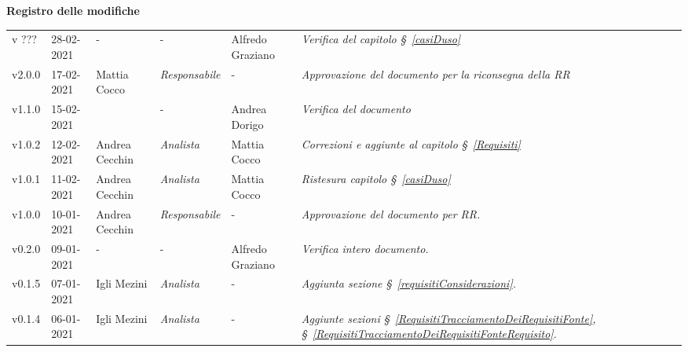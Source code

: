 \quad
\begin{center}
	\LARGE\textbf{Registro delle modifiche}
\end{center}
\def\tabularxcolumn#1{m{#1}}
{
	
\begin{center}
	\renewcommand{\arraystretch}{1.4}
	\begin{longtable}[c]{|p{2cm-1\tabcolsep}|p{2cm}|p{3cm-2\tabcolsep}|p{}|p{}|p{4cm-2\tabcolsep}|}
		\hline
		\rowcolor{airforceblue}
		\makecell[c]{\textbf{Versione}} & \makecell[c]{\textbf{Data}} & \makecell[c]{\textbf{Autore}} & \makecell[c]{\textbf{Ruolo}} & \makecell[c]{\textbf{Verificatore}} & \makecell[c]{\textbf{Modifica}}\\
		\hline
		\centering v ??? & 28-02-2021 & \centering -& \centering - & Alfredo Graziano & \textit{Verifica del capitolo \S~\ref{casiDuso}} \\
		\hline
		\centering v2.0.0 & 17-02-2021 & Mattia Cocco & \centering \textit{Responsabile} & \centering - & \textit{Approvazione del documento per la riconsegna della RR} \\
		\centering v1.1.0 & 15-02-2021 & \centering & \centering - & Andrea Dorigo & \textit{Verifica del documento} \\
		\centering v1.0.2 & 12-02-2021 & Andrea Cecchin & \centering \textit{Analista} & Mattia Cocco & \textit{Correzioni e aggiunte al capitolo \S~\ref{Requisiti}} \\
		\hline
		\centering v1.0.1 & 11-02-2021 & Andrea Cecchin & \centering \textit{Analista} & Mattia Cocco & \textit{Ristesura capitolo \S~\ref{casiDuso}} \\
		\hline
		\centering v1.0.0 & 10-01-2021 & Andrea Cecchin & \centering \textit{Responsabile} & \centering - & \textit{Approvazione del documento per RR.} \\
		\hline
		\centering v0.2.0 & 09-01-2021 & \centering - & \centering - & Alfredo Graziano & \textit{Verifica intero documento.} \\
		\hline
		\centering v0.1.5 & 07-01-2021 & Igli Mezini & \centering \textit{Analista} & \centering - & \textit{Aggiunta sezione \S~\ref{requisitiConsiderazioni}.} \\
		\hline
		\centering v0.1.4 & 06-01-2021 & Igli Mezini & \centering \textit{Analista} & \centering - & \textit{Aggiunte sezioni \S~\ref{RequisitiTracciamentoDeiRequisitiFonte}, \S~\ref{RequisitiTracciamentoDeiRequisitiFonteRequisito}.} \\

\end{longtable}
\end{center}}
